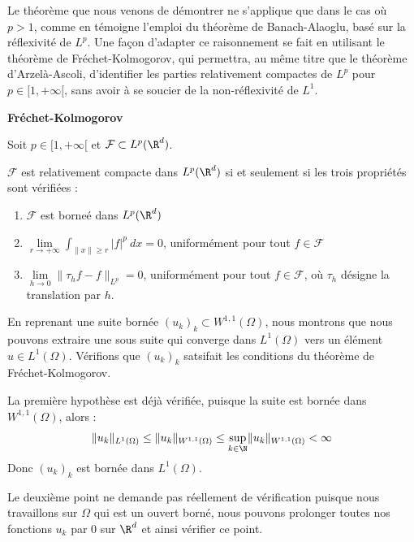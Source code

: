 \begin{remarkbox}
\begin{remark}
    Le théorème que nous venons de démontrer ne s'applique que dans le cas où $p>1$, comme en témoigne l'emploi du théorème de Banach-Alaoglu, basé sur la réflexivité de $L^p$.
    Une façon d'adapter ce raisonnement se fait en utilisant le théorème de Fréchet-Kolmogorov, qui permettra, au même titre que le théorème d'Arzelà-Ascoli, d'identifier les parties relativement compactes de $L^p$ pour $p \in [1,+\infty[$, sans avoir à se soucier de la non-réflexivité de $L^1$.
\end{remark}
\end{remarkbox}

\begin{theorembox}
\begin{theorem}
    \textbf{Fréchet-Kolmogorov}

    Soit $p \in [1,+\infty[$ et $\mathcal{F} \subset L^p(\R^d)$.

    $\mathcal{F}$ est relativement compacte dans $L^p(\R^d)$ si et seulement si les trois propriétés sont vérifiées :
    \begin{enumerate}
        \item $\mathcal{F}$ est borneé dans $L^p(\R^d)$
        \item $ \displaystyle \underset{r \to +\infty}{\lim} \int_{\|x\| \geq r} |f|^p \ dx = 0$, uniformément pour tout $f \in \mathcal{F}$ 
        \item $\displaystyle \underset{h \to 0}{\lim} \| \tau_h f - f \|_{L^p} = 0$, uniformément pour tout $f \in \mathcal{F}$, où $\tau_h$ désigne la translation par $h$.
    \end{enumerate}
\end{theorem}
\end{theorembox}

En reprenant une suite bornée $(u_k)_k \subset W^{1,1}(\Omega)$, nous montrons que nous pouvons extraire une sous suite qui converge dans $L^1(\Omega)$ vers un élément $u \in L^1(\Omega)$.
Vérifions que $(u_k)_k$ satsifait les conditions du théorème de Fréchet-Kolmogorov.

La première hypothèse est déjà vérifiée, puisque la suite est bornée dans $W^{1,1}(\Omega)$, alors :
$$\|u_k\|_{L^1(\Omega)} \leq \|u_k\|_{W^{1,1}(\Omega)} \leq \underset{k\in \N}{\sup}\|u_k\|_{W^{1,1}(\Omega)} < \infty$$
Donc $(u_k)_k$ est bornée dans $L^1(\Omega)$.

Le deuxième point ne demande pas réellement de vérification puisque nous travaillons sur $\Omega$ qui est un ouvert borné, nous pouvons prolonger toutes nos fonctions $u_k$ par 0 sur $\R^d$ et ainsi vérifier ce point.

